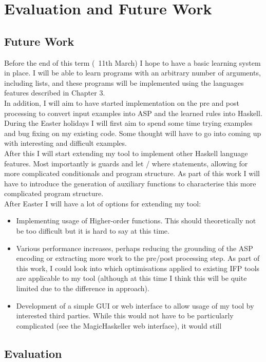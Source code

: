 \chapter{Evaluation and Future Work}

\section{Future Work}

Before the end of this term (~11th March) I hope to have a basic learning system in place. I will be able to learn programs with an arbitrary number of arguments, including lists, and these programs will be implemented using the languages features described in Chapter 3.  \\
In addition, I will aim to have started implementation on the pre and post processing to convert input examples into ASP and the learned rules into Haskell. \\

During the Easter holidays I will first aim to spend some time trying examples and bug fixing on my existing code. Some thought will have to go into coming up with interesting and difficult examples. \\

After this I will start extending my tool to implement other Haskell language features. Most importantly is guards and let / where statements, allowing for more complicated conditionals and program structure. As part of this work I will have to introduce the generation of auxiliary functions to characterise this more complicated program structure. \\

After Easter I will have a lot of options for extending my tool:

\begin{itemize}
\item Implementing usage of Higher-order functions. This should theoretically not be too difficult but it is hard to say at this time.
\item Various performance increases, perhaps reducing the grounding of the ASP encoding or extracting more work to the pre/post processing step. As part of this work, I could look into which optimisations applied to existing IFP tools are applicable to my tool (although at this time I think this will be quite limited due to the difference in approach).
\item Development of a simple GUI or web interface to allow usage of my tool by interested third parties. While this would not have to be particularly complicated (see the MagicHaskeller web interface), it would still 
\end{itemize}

\section{Evaluation}

\pagebreak
\renewcommand\bibname{{References}}

